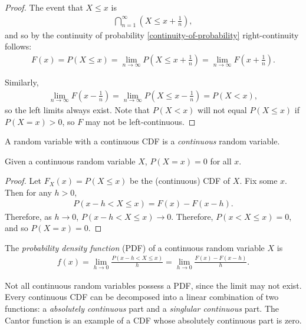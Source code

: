 \begin{proof}
    The event that $X \leq x$ is
    \begin{align*}
        \bigcap_{n = 1}^{\infty}(X \leq x + \frac{1}{n}),
    \end{align*}
    and so by the continuity of probability \ref{continuity-of-probability} right-continuity follows:
    \begin{align*}
        F(x) = P(X \leq x) = \lim_{n \to \infty}P(X \leq x + \frac{1}{n}) = \lim_{n \to \infty}F(x + \frac{1}{n}).
    \end{align*}

    Similarly,
    \begin{align*}
        \lim_{n \to \infty}F(x - \frac{1}{n}) = \lim_{n \to \infty}P(X \leq x - \frac{1}{n}) = P(X < x),
    \end{align*}
    so the left limits always exist. Note that $P(X < x)$ will not equal $P(X \leq x)$ if $P(X = x) > 0$, so $F$ may not be left-continuous.
\end{proof}

\begin{defn}
    A random variable with a continuous CDF is a \emph{continuous} random variable.
\end{defn}

\begin{prop}
    Given a continuous random variable $X$, $P(X = x) = 0$ for all $x$.
\end{prop}

\begin{proof}
    Let $F_X(x) = P(X \leq x)$ be the (continuous) CDF of $X$. Fix some $x$. Then for any $h > 0$,
    \begin{align*}
        P(x-h < X \leq x) = F(x) - F(x - h).
    \end{align*}
    Therefore, as $h \to 0$, $P(x - h < X \leq x) \to 0$. Therefore, $P(x < X \leq x) = 0$, and so $P(X = x) = 0$.
\end{proof}

\begin{defn}
    The \emph{probability density function} (PDF) of a continuous random variable $X$ is
    \begin{align*}
        f(x) = \lim_{h \to 0}\frac{P(x - h < X \leq x)}{h} = \lim_{h \to 0}\frac{F(x) - F(x-h)}{h}.
    \end{align*}
\end{defn}

\begin{rmk}
    Not all continuous random variables possess a PDF, since the limit may not exist. Every continuous CDF can be decomposed into a linear combination of two functions: a \emph{absolutely continuous} part and a \emph{singlular continuous} part. The Cantor function is an example of a CDF whose absolutely continuous part is zero.
\end{rmk}

